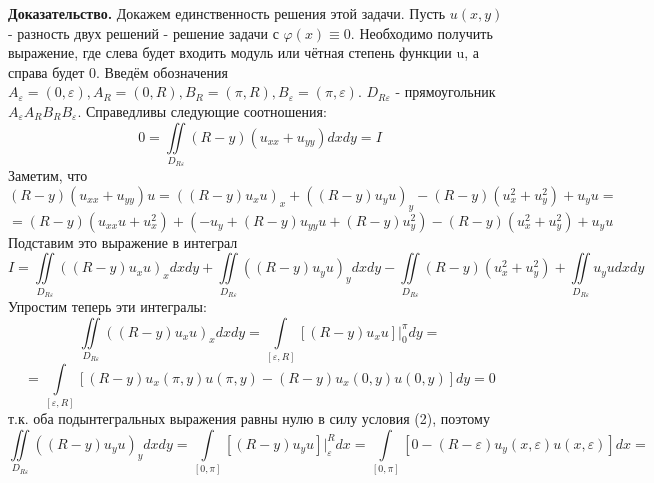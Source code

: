 \documentclass[12pt, a4paper]{article}
\begin{document}
\textbf{Доказательство.} 
	Докажем единственность решения этой задачи. Пусть $u(x,y)$ - разность двух решений - решение задачи с $\varphi(x) \equiv 0$. Необходимо получить выражение, где слева будет входить модуль или чётная степень функции u, а справа будет 0.\newline
	Введём обозначения $A_\varepsilon = (0, \varepsilon), A_R = (0, R), B_R = (\pi, R), B_\varepsilon = (\pi, \varepsilon)$. $D_{R\varepsilon}$ - прямоугольник $A_\varepsilon A_R B_R B_\varepsilon$. Справедливы следующие соотношения:
	\begin{equation*}
		0 = \iint\limits_{D_{R\varepsilon}} (R-y) (u_{xx} + u_{yy}) dx dy = I
	\end{equation*}
	Заметим, что 
	\begin{equation*}
		(R - y) (u_{xx} + u_{yy}) u = \left( \left(R - y\right) u_x u\right)_x  + \left( \left(R - y\right) u_y u\right)_y - \left(R- y\right) \left(u_x^2 + u_y^2\right) +  u_y u = 
	\end{equation*}
	\begin{equation*}
		= \left(R-y\right) \left(u_{xx} u + u_x^2\right) + \left(-u_y + \left(R-y\right) u_{yy} u + \left(R-y\right)u_y^2\right) - \left(R- y\right) \left(u_x^2 + u_y^2\right)+  u_y u
	\end{equation*}
	\newline Подставим это выражение в интеграл
	\begin{equation*}
		I	=	\iint\limits_{D_{R\varepsilon}} \left( \left(R - y\right) u_x u\right)_x dx dy  + \iint\limits_{D_{R\varepsilon}} \left( \left(R - y\right) u_y u\right)_y dx dy   
		- \iint\limits_{D_{R\varepsilon}} \left(R- y\right) \left(u_x^2 + u_y^2\right) + \iint\limits_{D_{R\varepsilon}} u_y u dx dy
	\end{equation*}
	Упростим теперь эти интегралы:\newline
	\begin{equation*}
		\iint\limits_{D_{R\varepsilon}} \left( \left(R - y\right) u_x u\right)_x dx dy = \int\limits_{[\varepsilon, R]} \left[(R-y)u_xu\right] \vert_0^\pi dy =  
	\end{equation*}
	\begin{equation*}
	 = \int\limits_{[\varepsilon, R]} \left[(R-y) u_x(\pi, y)u(\pi,y) - (R-y) u_x(0, y)u(0,y)\right]dy = 0
	\end{equation*}
	т.к. оба подынтегральных выражения равны нулю в силу условия (2), поэтому \newline
	\begin{equation*}
		\iint\limits_{D_{R\varepsilon}} \left( \left(R - y\right) u_y u\right)_y dx dy = \int\limits_{[0,\pi]} \left[\left(R - y\right) u_y u\right] \vert_\varepsilon^R dx =
		\int\limits_{[0,\pi]} \left[0 - \left(R - \varepsilon \right) u_y(x, \varepsilon) u(x, \varepsilon) \right] dx = 
	\end{equation*} 
\end{document}
